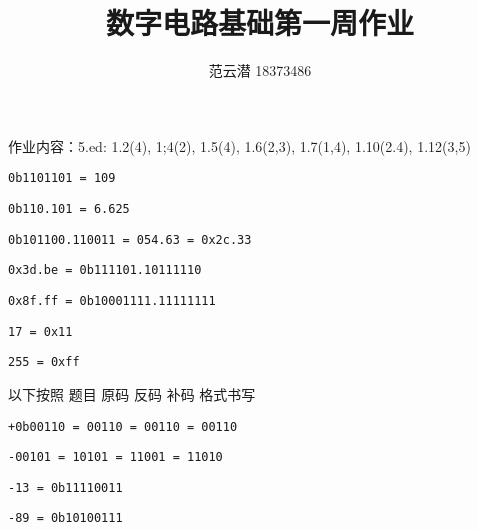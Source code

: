 \documentclass[lang=cn,11pt,a4paper,cite=authoryear]{elegantpaper}
\title{数字电路基础\quad 第一周作业}
\author{范云潜 18373486}
\institute{微电子学院 184111 班}
\date{\zhtoday}
\begin{document}
\maketitle

作业内容：5.ed: 1.2(4), 1;4(2), 1.5(4), 1.6(2,3), 1.7(1,4), 1.10(2.4), 1.12(3,5)


\lstinline{0b1101101 = 109}


\lstinline{0b110.101 = 6.625}


\lstinline{0b101100.110011 = 054.63 = 0x2c.33}


\lstinline{0x3d.be = 0b111101.10111110}

\lstinline{0x8f.ff = 0b10001111.11111111}


\lstinline{17 = 0x11}

\lstinline{255 = 0xff}



以下按照 题目 原码 反码 补码 格式书写

\lstinline{+0b00110 = 00110 = 00110 = 00110}

\lstinline{-00101 = 10101 = 11001 = 11010}


\lstinline{-13 = 0b11110011}

\lstinline{-89 = 0b10100111}

% 

\end{document}
